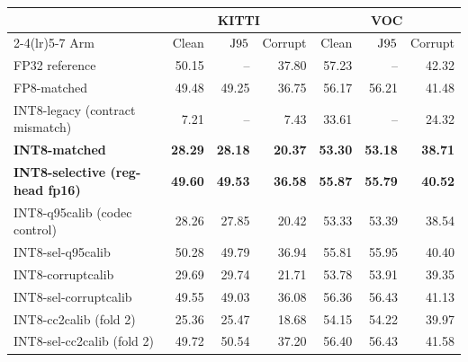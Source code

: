 \begin{tabular}{lrrrrrr}
\toprule
 & \multicolumn{3}{c}{KITTI} & \multicolumn{3}{c}{VOC} \\
\cmidrule(lr){2-4}\cmidrule(lr){5-7}
Arm & Clean & $\mathrm{J95}$ & Corrupt & Clean & $\mathrm{J95}$ & Corrupt \\
\midrule
FP32 reference & 50.15 & -- & 37.80 & 57.23 & -- & 42.32 \\
FP8-matched & 49.48 & 49.25 & 36.75 & 56.17 & 56.21 & 41.48 \\
INT8-legacy (contract mismatch) & 7.21 & -- & 7.43 & 33.61 & -- & 24.32 \\
\addlinespace[2pt]
\textbf{INT8-matched} & \textbf{28.29} & \textbf{28.18} & \textbf{20.37} & \textbf{53.30} & \textbf{53.18} & \textbf{38.71} \\
\textbf{INT8-selective (reg-head fp16)} & \textbf{49.60} & \textbf{49.53} & \textbf{36.58} & \textbf{55.87} & \textbf{55.79} & \textbf{40.52} \\
\addlinespace[2pt]
INT8-q95calib (codec control) & 28.26 & 27.85 & 20.42 & 53.33 & 53.39 & 38.54 \\
INT8-sel-q95calib & 50.28 & 49.79 & 36.94 & 55.81 & 55.95 & 40.40 \\
INT8-corruptcalib & 29.69 & 29.74 & 21.71 & 53.78 & 53.91 & 39.35 \\
INT8-sel-corruptcalib & 49.55 & 49.03 & 36.08 & 56.36 & 56.43 & 41.13 \\
INT8-cc2calib (fold 2) & 25.36 & 25.47 & 18.68 & 54.15 & 54.22 & 39.97 \\
INT8-sel-cc2calib (fold 2) & 49.72 & 50.54 & 37.20 & 56.40 & 56.43 & 41.58 \\
\bottomrule
\end{tabular}

